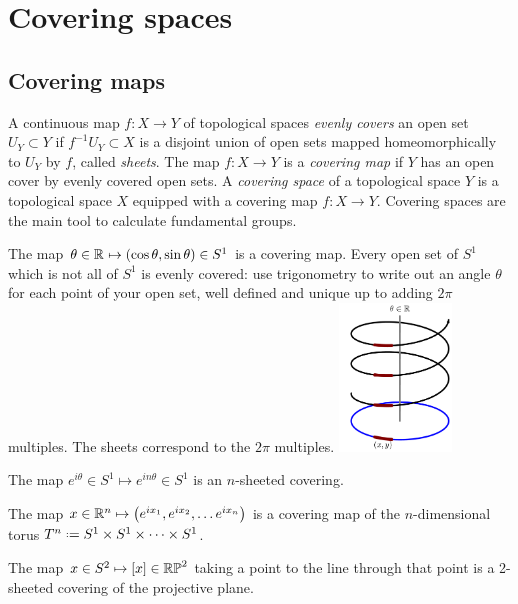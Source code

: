 \chapter{Covering spaces}\label{chapter:covering.spaces}

\section{Covering maps}
A continuous map \(f \colon X \to Y\) of topological spaces \emph{evenly covers}
an open set \(U_Y \subset Y\) if \(f^{-1}U_Y \subset X\) is a disjoint union of open sets mapped homeomorphically to \(U_Y\) by \(f\), called \emph{sheets}.
The map \(f \colon X \to Y\) is a \emph{covering map} if \(Y\) has an open cover by evenly covered open sets.
A \emph{covering space} of a topological space \(Y\) is a topological space \(X\) equipped with a covering map \(f \colon X \to Y\). 
Covering spaces are the main tool to calculate fundamental groups.
\begin{exampleAndImage}{3cm}
The map \(\theta \in \mathbb{R}^{} \mapsto \left(\cos \theta, \sin \theta\right) \in S^1\) is a covering map.
Every open set of \(S^1\) which is not all of \(S^1\) is evenly covered: use trigonometry to write out an angle \(\theta\) for each point of your open set, well defined and unique up to adding \(2\pi\) multiples.
The sheets correspond to the \(2\pi\) multiples.
\tcblower
\includegraphics[width=3cm]{circle-covering}
\end{exampleAndImage}
\begin{example}
The map \(e^{i \theta} \in S^1 \mapsto e^{i n \theta} \in S^1\) is an \(n\)-sheeted covering.
\end{example}
\begin{example}
The map \(x \in \mathbb{R}^{n} \mapsto \left(e^{ix_1}, e^{ix_2}, \dots e^{ix_n}\right)\) is a covering map of the \(n\)-dimensional torus \(T^n\defeq S^1 \times S^1 \times \dots \times S^1\).
\end{example}
\begin{example}
The map \(x \in S^2 \mapsto [x] \in \mathbb{RP}^{2}\) taking a point to the line through that point is a 2-sheeted covering of the projective plane.
\end{example}
